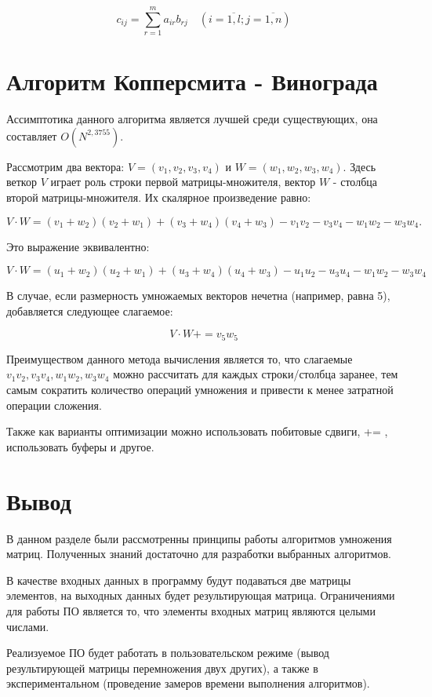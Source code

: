 \begin{equation}
	c_{ij} =
	\sum_{r=1}^{m} a_{ir}b_{rj} \quad (i=\overline{1,l}; j=\overline{1,n})
\end{equation}

\section{Алгоритм Копперсмита - Винограда}

Ассимптотика данного алгоритма является лучшей среди существующих, она составляет $O(N^{2,3755})$.

Рассмотрим два вектора: $V = (v_1, v_2, v_3, v_4)$ и $W = (w_1, w_2, w_3, w_4)$. Здесь веткор $V$ играет роль строки первой матрицы-множителя, вектор $W$ - столбца второй матрицы-множителя. Их скалярное произведение равно:

\begin{equation}
	V \cdot W = (v_1 + w_2)(v_2 + w_1) + (v_3 + w_4)(v_4 + w_3) - v_1v_2 - v_3v_4 - w_1w_2 - w_3w_4.
\end{equation}

Это выражение эквивалентно:

\begin{equation}
	V \cdot W = (u_1 + w_2)(u_2 + w_1) + (u_3 + w_4)(u_4 + w_3) - u_1u_2 - u_3u_4 - w_1w_2 - w_3w_4
\end{equation}

В случае, если размерность умножаемых векторов нечетна (например, равна 5), добавляется следующее слагаемое:

\begin{equation}
	V \cdot W += v_5w_5 
\end{equation}

Преимуществом данного метода вычисления является то, что слагаемые $v_1v_2, v_3v_4, w_1w_2, w_3w_4$ можно рассчитать для каждых строки/столбца заранее, тем самым сократить количество операций умножения и привести к менее затратной операции сложения.

Также как варианты оптимизации можно использовать побитовые сдвиги, += , использовать буферы и другое.

\section{Вывод}

В данном разделе были рассмотренны принципы работы алгоритмов умножения матриц. Полученных знаний достаточно для разработки выбранных алгоритмов.

В качестве входных данных в программу будут подаваться две матрицы элементов, на выходных данных будет результирующая матрица. Ограничениями для работы ПО является то, что элементы входных матриц являются целыми числами.

Реализуемое ПО будет работать в пользовательском режиме (вывод результирующей матрицы перемножения двух других), а также в экспериментальном (проведение замеров времени выполнения алгоритмов).